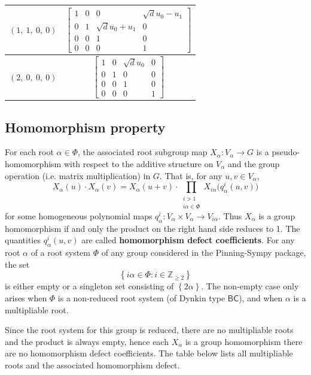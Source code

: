 \documentclass[11pt]{article}
\newcommand{\noi}{\noindent}
\newcommand{\tbf}{\textbf}
\newcommand{\lb}{\left\{}
\newcommand{\rb}{\right\}}
\newcommand{\Z}{\mathbb{Z}}
\theoremstyle{definition}
\newif\ifrootsystemreduced
\begin{document}
\begin{longtable}{|l|c|}
    \hline
    $\left( 1, \  1, \  0, \  0\right)$ & ${\left[\begin{matrix}1 & 0 & 0 & \sqrt{d} u_{0} - u_{1}\\0 & 1 & \sqrt{d} u_{0} + u_{1} & 0\\0 & 0 & 1 & 0\\0 & 0 & 0 & 1\end{matrix}\right]}$ \\
    \hline
    $\left( 2, \  0, \  0, \  0\right)$ & ${\left[\begin{matrix}1 & 0 & \sqrt{d} u_{0} & 0\\0 & 1 & 0 & 0\\0 & 0 & 1 & 0\\0 & 0 & 0 & 1\end{matrix}\right]}$ \\
    \hline
\end{longtable}


\subsection{Homomorphism property}

\noi For each root $\alpha \in \Phi$, the associated root subgroup map $X_\alpha:V_\alpha \to G$ is a pseudo-homomorphism with respect to the additive structure on $V_\alpha$ and the group operation (i.e. matrix multiplication) in $G$. That is, for any $u,v \in V_\alpha$,
\begin{equation}
\label{pseudo homomorphism}
	X_\alpha(u) \cdot X_\alpha(v) = X_\alpha(u+v) \cdot \prod_{\substack{i > 1 \\ i \alpha \in \Phi}} X_{i \alpha} \Big( q^i_\alpha(u,v) \Big)
\end{equation}
for some homogeneous polynomial maps $q^i_\alpha:V_\alpha \times V_\alpha \to V_{i \alpha}$. Thus $X_\alpha$ is a group homomorphism if and only the product on the right hand side reduces to 1. The quantities $q^i_\alpha(u,v)$ are called \tbf{homomorphism defect coefficients}. For any root $\alpha$ of a root system $\Phi$ of any group considered in the Pinning-Sympy package, the set
\[
	\lb i \alpha \in \Phi : i \in \Z_{\ge 2} \rb
\]
is either empty or a singleton set consisting of $\lb 2 \alpha \rb$. The non-empty case only arises when $\Phi$ is a non-reduced root system (of Dynkin type $\mathsf{BC}$), and when $\alpha$ is a multipliable root. 

\ifrootsystemreduced
Since the root system for this group is reduced, there are no multipliable roots and the product is always empty, hence each $X_\alpha$ is a group homomorphism there are no homomorphism defect coefficients.
\else
The table below lists all multipliable roots and the associated homomorphism defect.
\end{document}
